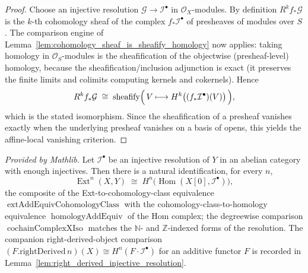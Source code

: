 \begin{proof}
  Choose an injective resolution \(\mathcal{G} \to \mathcal{I}^\bullet\) in
  \(\mathcal{O}_X\)-modules. By definition \(R^k f_*\mathcal{G}\) is the \(k\)-th
  cohomology sheaf of the complex \(f_*\mathcal{I}^\bullet\) of presheaves of modules
  over \(S\). The comparison engine of
  Lemma~\ref{lem:cohomology_sheaf_is_sheafify_homology} now applies: taking homology in
  \(\mathcal{O}_S\)-modules is the sheafification of the objectwise (presheaf-level)
  homology, because the sheafification/inclusion adjunction is exact (it preserves the
  finite limits and colimits computing kernels and cokernels). Hence
  \[
    R^k f_*\mathcal{G}
      \;\cong\;
    \operatorname{sheafify}\Bigl(\,V \longmapsto
      H^k\bigl((f_*\mathcal{I}^\bullet)(V)\bigr)\,\Bigr),
  \]
  which is the stated isomorphism. Since the sheafification of a presheaf vanishes
  exactly when the underlying presheaf vanishes on a basis of opens, this yields the
  affine-local vanishing criterion.
\end{proof}

\begin{lemma}
  \label{lem:ext_homcomplex_mathlib}
  \mathlibok
  \textit{Provided by Mathlib.}
  Let \(\mathcal{I}^\bullet\) be an injective resolution of \(Y\) in an abelian category with
  enough injectives. Then there is a natural identification, for every \(n\),
  \[
    \operatorname{Ext}^n(X, Y)
      \;\cong\;
    H^n\bigl(\operatorname{Hom}(X[0], \mathcal{I}^\bullet)\bigr),
  \]
  the composite of the Ext-to-cohomology-class equivalence
  \(\operatorname{extAddEquivCohomologyClass}\) with the cohomology-class-to-homology equivalence
  \(\operatorname{homologyAddEquiv}\) of the Hom complex; the degreewise comparison
  \(\operatorname{cochainComplexXIso}\) matches the \(\mathbb{N}\)- and \(\mathbb{Z}\)-indexed forms of
  the resolution. The companion right-derived-object comparison
  \((F.\mathrm{rightDerived}\,n)(X) \cong H^n(F \cdot \mathcal{I}^\bullet)\) for an additive functor
  \(F\) is recorded in Lemma~\ref{lem:right_derived_injective_resolution}.
\end{lemma}


